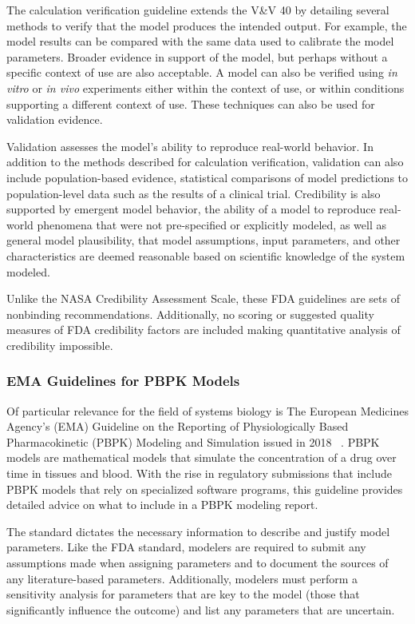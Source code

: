 \documentclass[12pt]{report}
\begin{document}
The calculation verification guideline extends the V\&V 40 by detailing several methods to verify that the model produces the intended output.  For example, the model results can be compared with the same data used to calibrate the model parameters. Broader evidence in support of the model, but perhaps without a specific context of use are also acceptable. A model can also be verified using \textit{in vitro} or \textit{in vivo} experiments either within the context of use, or within conditions supporting a different context of use. These techniques can also be used for validation evidence. 

Validation assesses the model's ability to reproduce real-world behavior. In addition to the methods described for calculation verification, validation can also include population-based evidence, statistical comparisons of model predictions to population-level data such as the results of a clinical trial. Credibility is also supported by emergent model behavior, the ability of a model to reproduce real-world phenomena that were not pre-specified or explicitly modeled, as well as general model plausibility, that model assumptions, input parameters, and other characteristics are deemed reasonable based on scientific knowledge of the system modeled. 

Unlike the NASA Credibility Assessment Scale, these FDA guidelines are sets of nonbinding recommendations. Additionally, no scoring or suggested quality measures of FDA credibility factors are included making quantitative analysis of credibility impossible.


\subsubsection{EMA Guidelines for PBPK Models}

Of particular relevance for the field of systems biology is The European Medicines Agency's (EMA) Guideline on the Reporting of Physiologically Based Pharmacokinetic (PBPK) Modeling and Simulation issued in 2018~\cite{viceconti2021, Shepard2015} . PBPK models are mathematical models that simulate the concentration of a drug over time in tissues and blood. With the rise in regulatory submissions that include PBPK models that rely on specialized software programs, this guideline provides detailed advice on what to include in a PBPK modeling report. 

The standard dictates the necessary information to describe and justify model parameters. Like the FDA standard, modelers are required to submit any assumptions made when assigning parameters and to document the sources of any literature-based parameters. Additionally, modelers must perform a sensitivity analysis for parameters that are key to the model (those that significantly influence the outcome) and list any parameters that are uncertain. 
\end{document}

